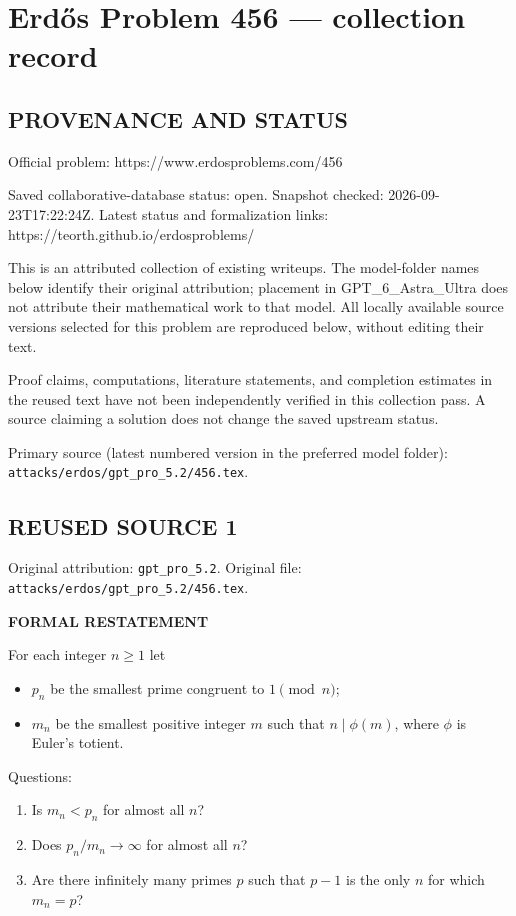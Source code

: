\section*{Erd\H{o}s Problem 456 --- collection record}

\subsection*{PROVENANCE AND STATUS}
Official problem: https://www.erdosproblems.com/456

Saved collaborative-database status: open.
Snapshot checked: 2026-09-23T17:22:24Z.
Latest status and formalization links: https://teorth.github.io/erdosproblems/

This is an attributed collection of existing writeups. The model-folder names below identify their original attribution; placement in GPT\_6\_Astra\_Ultra does not attribute their mathematical work to that model. All locally available source versions selected for this problem are reproduced below, without editing their text.

Proof claims, computations, literature statements, and completion estimates in the reused text have not been independently verified in this collection pass. A source claiming a solution does not change the saved upstream status.

Primary source (latest numbered version in the preferred model folder): \texttt{attacks/erdos/gpt\_pro\_5.2/456.tex}.

\subsection*{REUSED SOURCE 1}
Original attribution: \texttt{gpt\_pro\_5.2}.
Original file: \texttt{attacks/erdos/gpt\_pro\_5.2/456.tex}.


\textbf{FORMAL RESTATEMENT}

For each integer $n\ge 1$ let
\begin{itemize}
\item $p_n$ be the smallest prime congruent to $1\pmod n$;
\item $m_n$ be the smallest positive integer $m$ such that $n\mid \phi(m)$, where $\phi$ is Euler's totient.
\end{itemize}
Questions:
\begin{enumerate}
\item Is $m_n<p_n$ for almost all $n$?
\item Does $p_n/m_n\to\infty$ for almost all $n$?
\item Are there infinitely many primes $p$ such that $p-1$ is the only $n$ for which $m_n=p$?
\end{enumerate}

